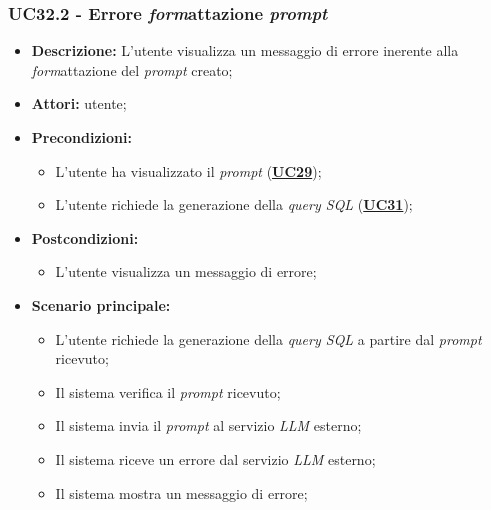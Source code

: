 \subsubsection{UC32.2 - Errore \textit{form}attazione \textit{prompt}}
\label{sec:UC32.2}
\begin{itemize}
	\item \textbf{Descrizione:} L'utente visualizza un messaggio di errore inerente alla \textit{form}attazione del \textit{prompt} creato;
	\item \textbf{Attori:} utente;
	\item \textbf{Precondizioni:} 
	\begin{itemize}
		\item L'utente ha visualizzato il \textit{prompt} (\hyperref[sec:UC29]{\textbf{UC29}});
		\item L'utente richiede la generazione della \textit{query SQL} (\hyperref[sec:UC31]{\textbf{UC31}});
	\end{itemize}
	\item \textbf{Postcondizioni:} 
	\begin{itemize}
		\item L'utente visualizza un messaggio di errore;
	\end{itemize}
	\item \textbf{Scenario principale:}
	\begin{itemize}
		\item L'utente richiede la generazione della \textit{query SQL} a partire dal \textit{prompt} ricevuto;
		\item Il sistema verifica il \textit{prompt} ricevuto;
		\item Il sistema invia il \textit{prompt} al servizio \textit{LLM} esterno;
		\item Il sistema riceve un errore dal servizio \textit{LLM} esterno;
		\item Il sistema mostra un messaggio di errore;
	\end{itemize}
\end{itemize}

